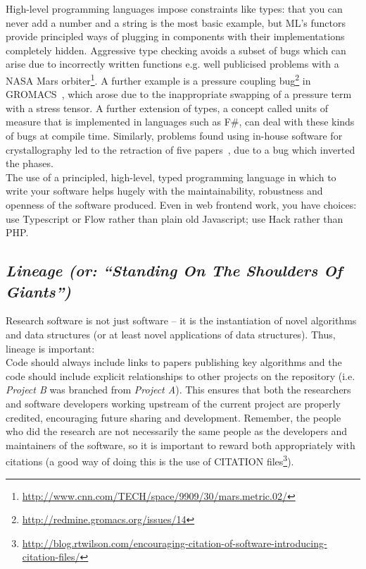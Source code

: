 \documentclass[a4paper,11pt]{article}
\begin{document}
High-level programming languages impose constraints like types: that
you can never add a number and a string is the most basic example, but
ML's functors provide principled ways of plugging in components with
their implementations completely hidden. Aggressive type checking
avoids a subset of bugs which can arise due to incorrectly written
functions e.g. well publicised problems with a NASA Mars
orbiter\footnote{\url{http://www.cnn.com/TECH/space/9909/30/mars.metric.02/}}.
A further example is a pressure coupling
bug\footnote{\url{http://redmine.gromacs.org/issues/14}} in
GROMACS~\cite{Hess2008}, which arose due to the inappropriate swapping
of a pressure term with a stress tensor.  A further extension of
types, a concept called units of measure that is implemented in
languages such as F\#, can deal with these kinds of bugs at compile
time. Similarly, problems found using in-house software for
crystallography led to the retraction of five
papers~\cite{Miller2006}, due to a bug which inverted the phases.\\

 The use of a
principled, high-level, typed programming language in which to write
your software helps hugely with the maintainability, robustness and
openness of the software produced. Even in web frontend work, you have
choices: use Typescript or Flow rather than plain old Javascript; use
Hack rather than PHP.

\subsection{{\emph{Lineage (or: ``Standing On The Shoulders Of Giants'')}}}

Research software is not just software -- it is the instantiation of
novel algorithms and data structures (or at least novel applications
of data structures). Thus, lineage is important:\\

 Code should always
include links to papers publishing key algorithms and the code should
include explicit relationships to other projects on the repository
(i.e. {\emph{Project B}} was branched from {\emph{Project A}}). This
ensures that both the researchers and software developers working
upstream of the current project are properly credited, encouraging
future sharing and development. Remember, the people who did the
research are not necessarily the same people as the developers and
maintainers of the software, so it is important to reward both
appropriately with citations (a good way of doing this is the use of
CITATION
files\footnote{\url{http://blog.rtwilson.com/encouraging-citation-of-software-introducing-citation-files/}}).
\end{document}
